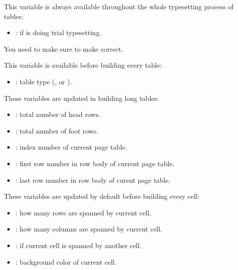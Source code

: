 \documentclass[oneside]{book}
\begin{document}
{This variable is always available throughout the whole typesetting process of tables:
\begin{itemize}[nosep]
  \item \CC{\lTblrMeasuringBool}: if  is doing trial typesetting.
\end{itemize}
You need to make sure  to make \CC{\lTblrMeasuringBool} correct.

This variable is available before building every table:
\begin{itemize}[nosep]
  \item \CC{\lTblrPortraitTypeTl}: table type (,  or ).
\end{itemize}

These variables are updated in building long tables:
\begin{itemize}[nosep]
  \item \CC{\lTblrRowHeadInt}: total number of head rows.
  \item \CC{\lTblrRowFootInt}: total number of foot rows.
  \item \CC{\lTblrTablePageInt}: index number of current page table.
  \item \CC{\lTblrRowFirstInt}: first row number in row body of current page table.
  \item \CC{\lTblrRowLastInt}: last row number in row body of curent page table.
\end{itemize}

These variables are updated by default before building every cell:
\begin{itemize}[nosep]
  \item \CC{\lTblrCellRowSpanInt}: how many rows are spanned by current cell.
  \item \CC{\lTblrCellColSpanInt}: how many columns are spanned by current cell.
  \item \CC{\lTblrCellOmittedBool}: if current cell is spanned by another cell.
  \item \CC{\lTblrCellBackgroundTl}: background color of current cell.
\end{itemize}

}
\end{document}
